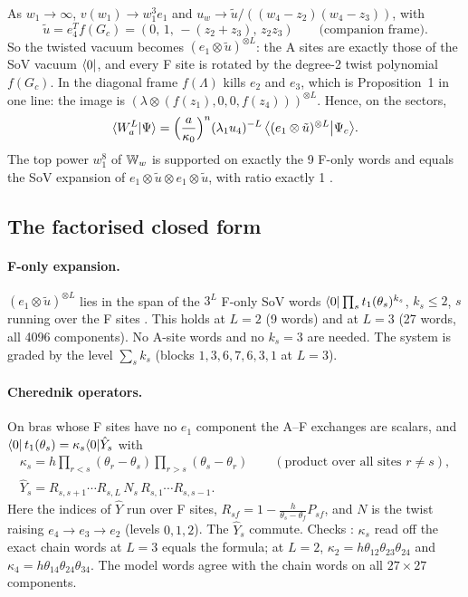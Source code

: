 As $w_1\to\infty$, $v(w_1)\to w_1^3e_1$ and $u_w\to\tilde u/((w_4-z_2)(w_4-z_3))$, with
\begin{equation}
 \tilde u=e_4^T f(G_c)=(0,\,1,\,-(z_2+z_3),\,z_2z_3)\qquad\text{(companion frame).}
\end{equation}
So the twisted vacuum becomes $(e_1\otimes\tilde u)^{\otimes L}$: the A sites are exactly those of the SoV vacuum $\langle0|$, and
every F site is rotated by the degree-2 twist polynomial $f(G_c)$. In the diagonal frame $f(\Lambda)$ kills $e_2$ and $e_3$,
which is Proposition~1 in one line: the image is $(\lambda\otimes(f(z_1),0,0,f(z_4)))^{\otimes L}$. Hence, on the sectors,
\begin{equation}\label{eq:qform-winf}
 \langle W_a^L|\Psi\rangle=\Big(\frac a{\kappa_0}\Big)^n(\lambda_1u_4)^{-L}\,\big\langle(e_1\otimes\tilde u)^{\otimes L}\big|\Psi_c\big\rangle .
\end{equation}
The top power $w_1^8$ of $\mathbb W_w$ is supported on exactly the 9 F-only words and equals the SoV expansion of
$e_1\otimes\tilde u\otimes e_1\otimes\tilde u$, with ratio exactly 1 \ex.

\subsection{The factorised closed form}\label{sec:qform-factor}

\paragraph{F-only expansion.} $(e_1\otimes\tilde u)^{\otimes L}$ lies in the span of the $3^L$ F-only SoV words
$\langle0|\prod_s t_1(\theta_s)^{k_s}$, $k_s\le2$, $s$ running over the F sites \ex. This holds at $L=2$ (9 words) and at $L=3$
(27 words, all 4096 components). No A-site words and no $k_s=3$ are needed. The system is graded by the level
$\sum_sk_s$ (blocks $1,3,6,7,6,3,1$ at $L=3$).

\paragraph{Cherednik operators.} On bras whose F sites have no $e_1$ component the A--F exchanges are scalars, and
$\langle0|\,t_1(\theta_s)=\kappa_s\langle0|\hat Y_s$ with
\begin{gather}
 \kappa_s=h\prod_{r<s}(\theta_r-\theta_s)\prod_{r>s}(\theta_s-\theta_r)\qquad(\text{product over all sites }r\ne s),\\
 \hat Y_s=R_{s,s+1}\cdots R_{s,L}\,N_s\,R_{s,1}\cdots R_{s,s-1}.
\end{gather}
Here the indices of $\hat Y$ run over F sites, $R_{sf}=1-\frac h{\theta_s-\theta_f}P_{sf}$, and $N$ is the twist raising
$e_4\to e_3\to e_2$ (levels $0,1,2$). The $\hat Y_s$ commute. Checks \ex: $\kappa_s$ read off the exact chain words at $L=3$
equals the formula; at $L=2$, $\kappa_2=h\theta_{12}\theta_{23}\theta_{24}$ and $\kappa_4=h\theta_{14}\theta_{24}\theta_{34}$.
The model words agree with the chain words on all $27\times27$ components.

